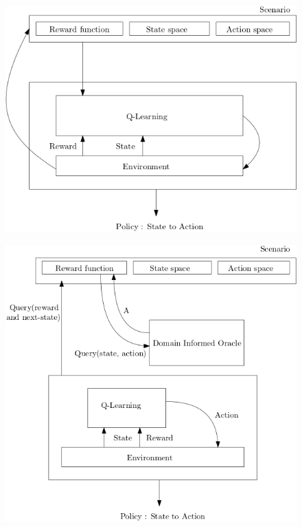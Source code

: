 \begin{figure}[H]
  \centering
  \begin{minipage}{.5\textwidth}
    \centering
    \includegraphics[width=1\linewidth]{figures/basicrl.png}
    \label{fig:basicrl}
  \end{minipage}%
  \begin{minipage}{.45\textwidth}
    \centering
    \includegraphics[width=1\linewidth]{figures/dio.png}
    \label{fig:diorl}
  \end{minipage}
\end{figure}


